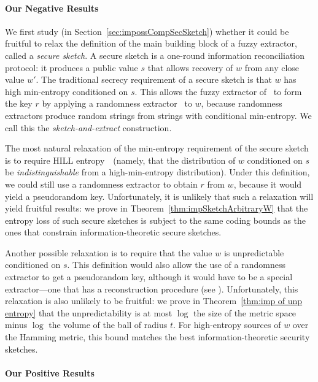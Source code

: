 \documentclass{llncs}
\newcommand{\secref}[1]{\mbox{Section~\ref{#1}}}
\newcommand{\thref}[1]{\mbox{Theorem~\ref{#1}}}
\begin{document}
\paragraph {Our Negative Results}
We first study (in  \secref{sec:impossCompSecSketch}) whether it could be fruitful to relax the definition of the main building block of a fuzzy extractor, called a \emph{secure sketch}.  A secure sketch is a one-round information reconciliation protocol: it  produces a public value $s$ that allows recovery of $w$ from any close value $w'$.  The traditional secrecy requirement of a secure sketch is that $w$ has high min-entropy conditioned on $s$.  This allows the fuzzy extractor of~\cite{DBLP:journals/siamcomp/DodisORS08}  to form the key $r$ by applying a randomness extractor~\cite{nisan1993randomness} to $w$, because randomness extractors produce random strings from strings with conditional min-entropy. We call this the \emph{sketch-and-extract} construction.

The most natural relaxation of the min-entropy requirement of the secure sketch is to require HILL entropy~\cite{DBLP:journals/siamcomp/HastadILL99}~(namely, that the distribution of $w$ conditioned on $s$ be \emph{indistinguishable} from a high-min-entropy distribution).  Under this definition, we could still use a randomness extractor to obtain $r$ from $w$, because it would yield a pseudorandom key.  Unfortunately, it is unlikely that such a relaxation will yield fruitful results: we prove in Theorem~\ref{thm:impSketchArbitraryW} that the entropy loss of such secure sketches is subject to the same coding bounds as the ones that constrain information-theoretic secure sketches.  

Another possible relaxation is to require that the value $w$ is unpredictable conditioned on $s$. This definition would also allow the use of a randomness extractor to get a pseudorandom key, although it would have to be a special extractor---one that has  a reconstruction procedure (see \cite[Lemma 6]{DBLP:conf/eurocrypt/HsiaoLR07}).  Unfortunately, this relaxation is also unlikely to be fruitful:  we prove in \thref{thm:imp of unp entropy} that the unpredictability is at most $\log$ the size of the metric space minus $\log$ the volume of the ball of radius $t$.  For high-entropy sources of $w$ over the Hamming metric, this bound matches the best information-theoretic security sketches.

\paragraph {Our Positive Results}
\end{document}
